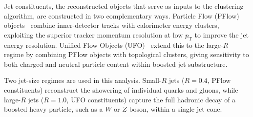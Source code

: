 Jet constituents, the reconstructed objects that serve as inputs to the clustering algorithm, are constructed in two complementary ways. Particle Flow (PFlow) objects~\cite{ATLAS:PFlow:2017} combine inner-detector tracks with calorimeter energy clusters, exploiting the superior tracker momentum resolution at low $p_\mathrm{T}$ to improve the jet energy resolution. Unified Flow Objects (UFO)~\cite{ATLAS:UFO:2021} extend this to the large-$R$ regime by combining PFlow objects with topological clusters, giving sensitivity to both charged and neutral particle content within boosted jet substructure.

Two jet-size regimes are used in this analysis. Small-$R$ jets ($R = 0.4$, PFlow constituents) reconstruct the showering of individual quarks and gluons, while large-$R$ jets ($R = 1.0$, UFO constituents) capture the full hadronic decay of a boosted heavy particle, such as a $W$ or $Z$ boson, within a single jet cone.
